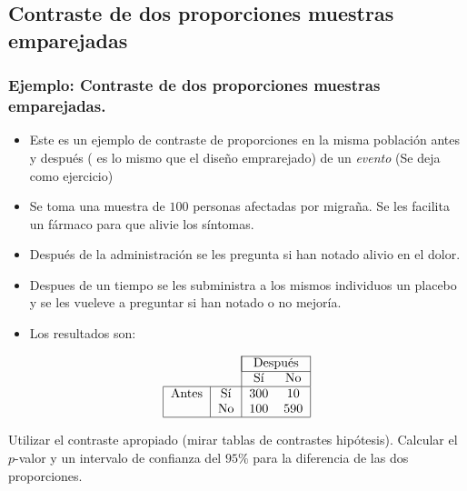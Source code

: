 \subsection{Contraste de dos proporciones muestras emparejadas}
\begin{frame}
\frametitle{Ejemplo: Contraste de dos  proporciones muestras emparejadas.}
\begin{itemize}
\item Este es un ejemplo de contraste de proporciones en la misma población antes y después ( es lo mismo que el diseño  emprarejado) de un \textsl{evento} (Se deja como ejercicio)
\item Se toma una muestra de $100$ personas afectadas por migraña.  Se les facilita un fármaco para que alivie los síntomas.
\item Después de la administración se les pregunta si han notado alivio en el dolor.
\item Despues de un tiempo se les subministra a los mismos individuos un placebo y se les vueleve a preguntar si han notado o no mejoría.
\item  Los resultados son:
\end{itemize}
\end{frame}

\begin{frame}

$$
\begin{tabular}{|c|c|cc|}
\cline{3-4}
     \multicolumn{2}{c|}{}& \multicolumn{2}{|c|} {Después}\\\cline{3-4}
   \multicolumn{2}{c|}{} & Sí & No \\\hline
Antes & Sí &  300 & 10 \\
    & No   & 100 & 590 
\\\hline
\end{tabular}
$$

Utilizar el contraste apropiado (mirar tablas de contrastes hipótesis). Calcular el $p$-valor y un intervalo de confianza del $95\%$ para la diferencia de las dos proporciones.
\end{frame}

